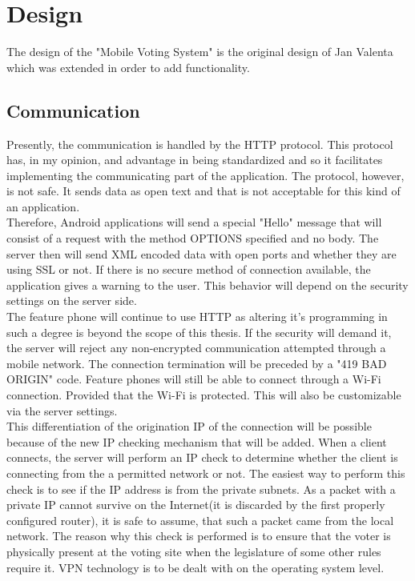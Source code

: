 \documentclass[11pt,twoside,a4paper]{book}
\begin{document}

\chapter{Design}
The design of the "Mobile Voting System" is the original design of Jan Valenta which was extended in order to add functionality.
\section{Communication}

Presently, the communication is handled by the HTTP protocol. This protocol has, in my opinion, and advantage in being standardized and so it facilitates implementing the communicating part of the application. The protocol, however, is not safe. It sends data as open text and that is not acceptable for this kind of an application.\\
 Therefore, Android applications will send a special "Hello" message that will consist of a request with the method OPTIONS specified and no body. The server then will send XML encoded data with open ports and whether they are using SSL or not. If there is no secure method of connection available, the application gives a warning to the user. This behavior will depend on the security settings on the server side. \\
  The feature phone will continue to use HTTP as altering it's programming in such a degree is beyond the scope of this thesis. If the security will demand it, the server will reject any non-encrypted communication attempted through a mobile network. The connection termination will be preceded by a "419 BAD ORIGIN" code. Feature phones will still be able to connect through a Wi-Fi connection. Provided that the Wi-Fi is protected. This will also be customizable via the server settings.\\
 
This differentiation of the origination IP of the connection  will be possible because of the new IP checking mechanism that will be added. When a client connects, the server will perform an IP check to determine whether the client is connecting from the a permitted network or not. The easiest way to perform this check is to see if the IP address is from the private subnets. As a packet with a private IP cannot survive on the Internet(it is discarded by the first properly configured router), it is safe to assume, that such a packet came from the local network. The reason why this check is performed is to ensure that the voter is physically present at the voting site when the legislature of some other rules require it. VPN technology is to be dealt with on the operating system level.\\
\end{document}
